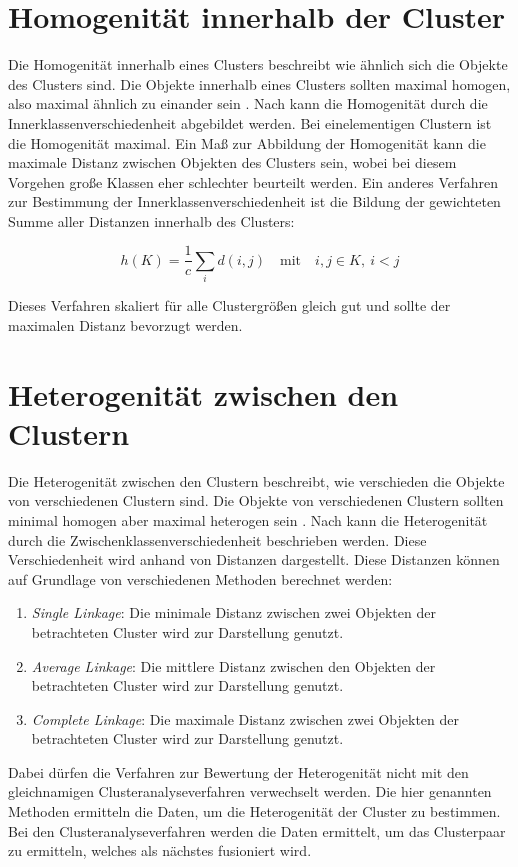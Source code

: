 \section{Homogenität innerhalb der Cluster}
Die Homogenität innerhalb eines Clusters beschreibt wie ähnlich sich die Objekte des Clusters sind. Die Objekte innerhalb eines Clusters sollten maximal homogen, also maximal ähnlich zu einander sein \citep[Vgl.][S. 16]{Bacher.2010}.
Nach \citet[S. 181]{Bankhofer.2008} kann die Homogenität durch die Innerklassenverschiedenheit abgebildet werden. Bei einelementigen Clustern ist die Homogenität maximal. Ein Maß zur Abbildung der Homogenität kann die maximale Distanz zwischen Objekten des Clusters sein, wobei bei diesem Vorgehen große Klassen eher schlechter beurteilt werden. Ein anderes Verfahren zur Bestimmung der Innerklassenverschiedenheit ist die Bildung der gewichteten Summe aller Distanzen innerhalb des Clusters:

\begin{equation}
h(K)= \frac{1}{c} \sum_{i} d(i,j) \quad \text{mit} \quad i,j \in K,\: i<j
\end{equation}

Dieses Verfahren skaliert für alle Clustergrößen gleich gut und sollte der maximalen Distanz bevorzugt werden.

\section{Heterogenität zwischen den Clustern}
Die Heterogenität zwischen den Clustern beschreibt, wie verschieden die Objekte von verschiedenen Clustern sind. Die Objekte von verschiedenen Clustern sollten minimal homogen aber maximal heterogen sein \citep[Vgl.][S. 16]{Bacher.2010}.
Nach \citet[S. 181]{Bankhofer.2008} kann die Heterogenität durch die Zwischenklassenverschiedenheit beschrieben werden. Diese Verschiedenheit wird anhand von Distanzen dargestellt. Diese Distanzen können auf Grundlage von verschiedenen Methoden berechnet werden:
\begin{enumerate}
        \item \textit{Single Linkage}: Die minimale Distanz zwischen zwei Objekten der betrachteten Cluster wird zur Darstellung genutzt.
        \item \textit{Average Linkage}: Die mittlere Distanz zwischen den Objekten der betrachteten Cluster wird zur Darstellung genutzt.
        \item \textit{Complete Linkage}: Die maximale Distanz zwischen zwei Objekten der betrachteten Cluster wird zur Darstellung genutzt.
\end{enumerate}
Dabei dürfen die Verfahren zur Bewertung der Heterogenität nicht mit den gleichnamigen Clusteranalyseverfahren verwechselt werden. Die hier genannten Methoden ermitteln die Daten, um die Heterogenität der Cluster zu bestimmen. Bei den Clusteranalyseverfahren werden die Daten ermittelt, um das Clusterpaar zu ermitteln, welches als nächstes fusioniert wird. 

